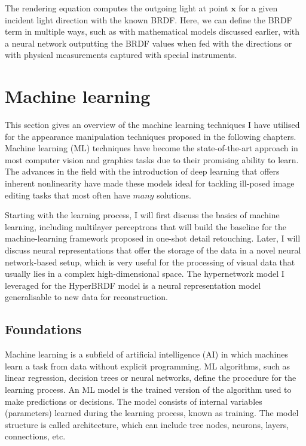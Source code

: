 The rendering equation computes the outgoing light at point $\mathbf{x}$ for a given incident light direction with the known \gls{BRDF}. Here, we can define the \gls{BRDF} term in multiple ways, such as with mathematical models discussed earlier, with a neural network outputting the \gls{BRDF} values when fed with the directions or with physical measurements captured with special instruments. 

\section{Machine learning}
This section gives an overview of the machine learning techniques I have utilised for the appearance manipulation techniques proposed in the following chapters. Machine learning (\gls{ML}) techniques have become the state-of-the-art approach in most computer vision and graphics tasks due to their promising ability to learn. The advances in the field with the introduction of deep learning that offers inherent nonlinearity have made these models ideal for tackling ill-posed image editing tasks that most often have $many$ solutions.

Starting with the learning process, I will first discuss the basics of machine learning, including multilayer perceptrons that will build the baseline for the machine-learning framework proposed in one-shot detail retouching. Later, I will discuss neural representations that offer the storage of the data in a novel neural network-based setup, which is very useful for the processing of visual data that usually lies in a complex high-dimensional space. The hypernetwork model I leveraged for the HyperBRDF model is a neural representation model generalisable to new data for reconstruction.


\subsection{Foundations}
Machine learning is a subfield of artificial intelligence (\gls{AI}) in which machines learn a task from data without explicit programming. \gls{ML} algorithms, such as linear regression, decision trees or neural networks, define the procedure for the learning process. An \gls{ML} model is the trained version of the algorithm used to make predictions or decisions. The model consists of internal variables (parameters) learned during the learning process, known as training. The model structure is called architecture, which can include tree nodes, neurons, layers, connections, etc.

